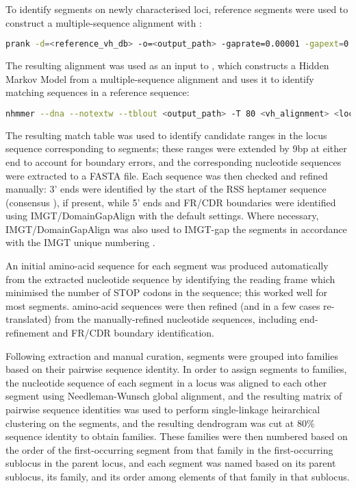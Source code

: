 \subsubsubsection{\vh}

To identify \vh segments on newly characterised loci, reference \vh segments were used to construct a multiple-sequence alignment with  \parencite{loytynoja2014prank}:

\begin{lstlisting}[language=bash]
prank -d=<reference_vh_db> -o=<output_path> -gaprate=0.00001 -gapext=0.00001 -F -termgap
\end{lstlisting}

The resulting alignment was used as an input to  \parencite{wheeler2013nhmmer,eddy2011hmm,eddy2009homology,eddy2008alignment}, which constructs a Hidden Markov Model from a multiple-sequence alignment and uses it to identify matching sequences in a reference sequence:

\begin{lstlisting}[language=bash]
nhmmer --dna --notextw --tblout <output_path> -T 80 <vh_alignment> <locus_sequence_path>
\end{lstlisting}

The resulting match table was used to identify candidate ranges in the locus sequence corresponding to \vh segments; these ranges were extended by 9bp at either end to account for boundary errors, and the corresponding nucleotide sequences were extracted to a FASTA file. Each sequence was then checked and refined manually: 3' ends were identified by the start of the RSS heptamer sequence (consensus ), if present, while 5' ends and FR/CDR boundaries were identified using IMGT/DomainGapAlign \parencite{ehrenmann2011domaingapalign} with the default settings. Where necessary, IMGT/DomainGapAlign was also used to IMGT-gap the \vh segments in accordance with the IMGT unique numbering \parencite{lefranc2003vnumbering}.

An initial amino-acid sequence for each \vh segment was produced automatically from the extracted nucleotide sequence by identifying the reading frame which minimised the number of STOP codons in the sequence; this worked well for most segments. \vh amino-acid sequences were then refined (and in a few cases re-translated) from the manually-refined nucleotide sequences, including end-refinement and FR/CDR boundary identification.

Following extraction and manual curation, \vh segments were grouped into families based on their pairwise sequence identity. In order to assign segments to families, the nucleotide sequence of each \vh segment in a locus was aligned to each other segment using Needleman-Wunsch global alignment, and the resulting matrix of pairwise sequence identities was used to perform single-linkage heirarchical clustering on the \vh segments, and the resulting dendrogram was cut at 80\% sequence identity to obtain \vh families. These families were then numbered based on the order of the first-occurring \vh segment from that family in the first-occurring sublocus in the parent locus, and each \vh segment was named based on its parent sublocus, its family, and its order among elements of that family in that sublocus.

